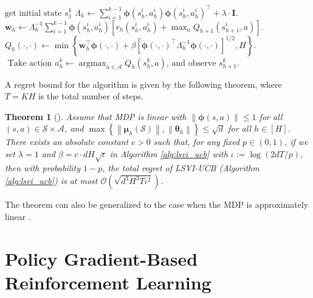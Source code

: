 \documentclass{article}
\numberwithin{equation}{section}
\newtheorem{theorem}{Theorem}
\begin{document}
\begin{algorithm}
	\caption{Least-Squares Value Iteration with UCB (LSVI-UCB)}
	\begin{algorithmic}[1]\label{alg:lsvi_ucb}
            \STATE $\text {get initial state } s_1^k$
                \STATE $\Lambda_h \leftarrow \sum_{i=1}^{k-1} \boldsymbol{\phi}\left(s_h^i, a_h^i\right) \boldsymbol{\phi}\left(s_h^i, a_h^i\right)^{\top}+\lambda \cdot \mathbf{I} .$
                \STATE $\mathbf{w}_h \leftarrow \Lambda_h^{-1} \sum_{i=1}^{k-1} \boldsymbol{\phi}\left(s_h^i, a_h^i\right)\left[r_h\left(s_h^i, a_h^i\right)+\max _a Q_{h+1}\left(s_{h+1}^i, a\right)\right] .$
                \STATE $Q_h(\cdot, \cdot) \leftarrow \min \left\{\mathbf{w}_h^{\top} \boldsymbol{\phi}(\cdot, \cdot)+\beta\left[\boldsymbol{\phi}(\cdot, \cdot)^{\top} \Lambda_h^{-1} \boldsymbol{\phi}(\cdot, \cdot)\right]^{1 / 2}, H\right\} .$
            \ENDFOR
                \STATE $\text { Take action } a_h^k \leftarrow \operatorname{argmax}_{a \in \mathcal{A}} Q_h\left(s_h^k, a\right) \text {, and observe } s_{h+1}^k.$
            \ENDFOR
        \ENDFOR
	\end{algorithmic}	
\end{algorithm}

A regret bound for the algorithm is given by the following theorem, where $T = KH$ is the total number of steps.
\begin{theorem}[\citep{jin2020provably}]
    Assume that MDP is linear with $\|\boldsymbol{\phi}(s, a)\| \leq 1$ for all $(s, a) \in \mathcal{S} \times \mathcal{A}$, and $\max \left\{\left\|\boldsymbol{\mu}_h(\mathcal{S})\right\|,\left\|\boldsymbol{\theta}_h\right\|\right\} \leq \sqrt{d}$ for all $h \in[H]$. There exists an absolute constant $c>0$ such that, for any fixed $p \in (0,1)$, if we set $\lambda=1$ and $\beta=c \cdot d H \sqrt{\iota}$ in Algorithm \ref{alg:lsvi_ucb} with $\iota:=\log (2 d T / p)$, then with probability $1-p$, the total regret of LSVI-UCB (Algorithm \ref{alg:lsvi_ucb}) is at most $\mathcal{O}\left(\sqrt{d^3 H^3 T \iota^2}\right)$.
\end{theorem}
The theorem can also be generalized to the case when the MDP is approximately linear \citep{jin2020provably}.

\section{Policy Gradient-Based Reinforcement Learning}\label{sec:policy_gradient}
\end{document}
